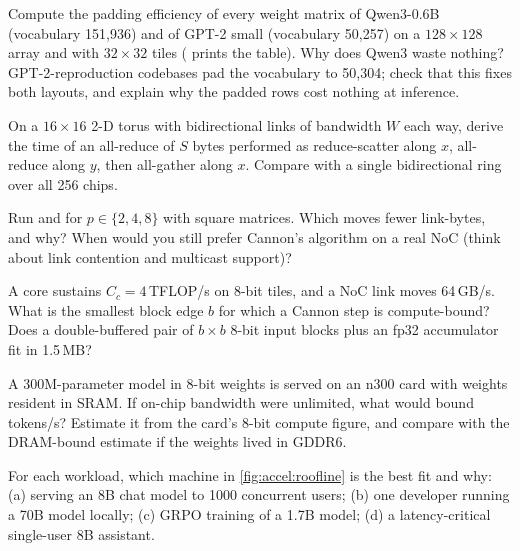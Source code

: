 \begin{exercise}
Compute the padding efficiency of every weight matrix of Qwen3-0.6B (vocabulary 151,936) and of
GPT-2 small (vocabulary 50,257) on a $128\times128$ array and with $32\times32$ tiles
( prints the table). Why does Qwen3 waste nothing? GPT-2-reproduction codebases pad the
vocabulary to 50,304; check that this fixes both layouts, and explain why the padded rows cost
nothing at inference.
\end{exercise}

\begin{exercise}
On a $16\times16$ 2-D torus with bidirectional links of bandwidth $W$ each way, derive the time of
an all-reduce of $S$ bytes performed as reduce-scatter along $x$, all-reduce along $y$, then
all-gather along $x$. Compare with a single bidirectional ring over all 256 chips.
\end{exercise}

\begin{exercise}
Run  and  for $p\in\{2,4,8\}$ with square matrices.
Which moves fewer link-bytes, and why? When would you still prefer Cannon's algorithm on a real NoC
(think about link contention and multicast support)?
\end{exercise}

\begin{exercise}
A core sustains $C_c=4$\,TFLOP/s on 8-bit tiles, and a NoC link moves 64\,GB/s. What is the smallest
block edge $b$ for which a Cannon step is compute-bound? Does a double-buffered pair of $b\times b$
8-bit input blocks plus an fp32 accumulator fit in 1.5\,MB?
\end{exercise}

\begin{exercise}
A 300M-parameter model in 8-bit weights is served on an n300 card with weights resident in SRAM. If
on-chip bandwidth were unlimited, what would bound tokens/s? Estimate it from the card's 8-bit
compute figure, and compare with the DRAM-bound estimate if the weights lived in GDDR6.
\end{exercise}

\begin{exercise}
For each workload, which machine in \cref{fig:accel:roofline} is the best fit and why: (a) serving
an 8B chat model to 1000 concurrent users; (b) one developer running a 70B model locally;
(c) GRPO training of a 1.7B model; (d) a latency-critical single-user 8B assistant.
\end{exercise}

